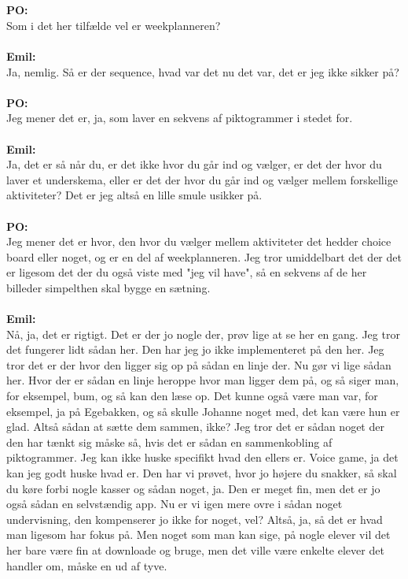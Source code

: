 \\\\
\textbf{PO:}\\
Som i det her tilfælde vel er weekplanneren?
\\\\
\textbf{Emil:}\\
Ja, nemlig.
Så er der sequence, hvad var det nu det var, det er jeg ikke sikker på?
\\\\
\textbf{PO:}\\
Jeg mener det er, ja, som laver en sekvens af piktogrammer i stedet for.
\\\\
\textbf{Emil:}\\
Ja, det er så når du, er det ikke hvor du går ind og vælger, er det der hvor du laver et underskema, eller er det der hvor du går ind og vælger mellem forskellige aktiviteter?
Det er jeg altså en lille smule usikker på.
\\\\
\textbf{PO:}\\
Jeg mener det er hvor, den hvor du vælger mellem aktiviteter det hedder choice board eller noget, og er en del af weekplanneren.
Jeg tror umiddelbart det der det er ligesom det der du også viste med "jeg vil have", så en sekvens af de her billeder simpelthen skal bygge en sætning.
\\\\
\textbf{Emil:}\\
Nå, ja, det er rigtigt. Det er der jo nogle der, prøv lige at se her en gang.
Jeg tror det fungerer lidt sådan her.
Den har jeg jo ikke implementeret på den her.
Jeg tror det er der hvor den ligger sig op på sådan en linje der.
Nu gør vi lige sådan her.
Hvor der er sådan en linje heroppe hvor man ligger dem på, og så siger man, for eksempel, bum, og så kan den læse op.
Det kunne også være man var, for eksempel, ja på Egebakken, og så skulle Johanne noget med, det kan være hun er glad.
Altså sådan at sætte dem sammen, ikke?
Jeg tror det er sådan noget der den har tænkt sig måske så, hvis det er sådan en sammenkobling af piktogrammer.
Jeg kan ikke huske specifikt hvad den ellers er.
Voice game, ja det kan jeg godt huske hvad er.
Den har vi prøvet, hvor jo højere du snakker, så skal du køre forbi nogle kasser og sådan noget, ja.
Den er meget fin, men det er jo også sådan en selvstændig app.
Nu er vi igen mere ovre i sådan noget undervisning, den kompenserer jo ikke for noget, vel?
Altså, ja, så det er hvad man ligesom har fokus på. 
Men noget som man kan sige, på nogle elever vil det her bare være fin at downloade og bruge, men det ville være enkelte elever det handler om, måske en ud af tyve.
